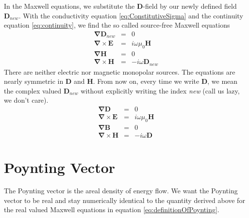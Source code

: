 \documentclass[12pt,a4paper,twoside,openright,BCOR10mm,headsepline,titlepage,abstracton,chapterprefix,final]{scrreprt}
\newcommand\Vector[1]{{\mathbf{#1}}}
\newcommand\vacuum{0}
\newcommand\Nabla{\Vector{\nabla}}
\newcommand\scalarEfield{E}
\newcommand\scalarBfield{B}
\newcommand\scalarHfield{H}
\newcommand\scalarDfield{D}
\newcommand\Efield{\Vector{\scalarEfield}}
\newcommand\Bfield{\Vector{\scalarBfield}}
\newcommand\Hfield{\Vector{\scalarHfield}}
\newcommand\Dfield{\Vector{\scalarDfield}}
\newcommand\vacuumpermeability{\scalarpermeability_{\vacuum}}
\newcommand\scalarpermeability{\mu}
\begin{document}
In the Maxwell equations, we substitute the $\Dfield$-field by our newly defined field $\Dfield_{new}$.
With the conductivity equation \ref{eq:ConstitutiveSigma} and the continuity equation \ref{eq:continuity}, we find the so called source-free Maxwell equations
\begin{subequations}
\begin{eqnarray}
  \Nabla \Dfield_{new} &=& 0 					\label{eq:divDsourcefree}\\
  \Nabla \times \Efield &=& i \omega \vacuumpermeability \Hfield	\\
  \Nabla \Hfield &=& 0  					\\
  \Nabla \times \Hfield &=& - i \omega \Dfield_{new}  		
\end{eqnarray}
\end{subequations}
There are neither electric nor magnetic monopolar sources.
The equations are nearly symmetric in $\Dfield$ and $\Hfield$.
From now on, every time we write $\Dfield$, we mean the complex valued $\Dfield_{new}$ without explicitly writing the index \emph{new} (call us lazy, we don't care).
\begin{subequations}
\begin{eqnarray}
  \Nabla \Dfield &=& 0 					 	 \label{eq:sourcefreemaxwell_divD} \\
  \Nabla \times \Efield &=& i \omega \vacuumpermeability \Hfield \label{eq:sourcefreemaxwell_rotE}	\\
  \Nabla \Bfield &=& 0  					 \label{eq:sourcefreemaxwell_divB} \\
  \Nabla \times \Hfield &=& - i \omega \Dfield  		 \label{eq:sourcefreemaxwell_rotH}
\end{eqnarray}
\label{eq:sourcefreemaxwell}
\end{subequations}

\section{Poynting Vector}\label{sec:Poynting}
The Poynting vector is the areal density of energy flow. 
We want the Poynting vector to be real and stay numerically identical to the quantity derived above 
for the real valued Maxwell equations in equation \ref{eq:definitionOfPoynting}.
\end{document}
